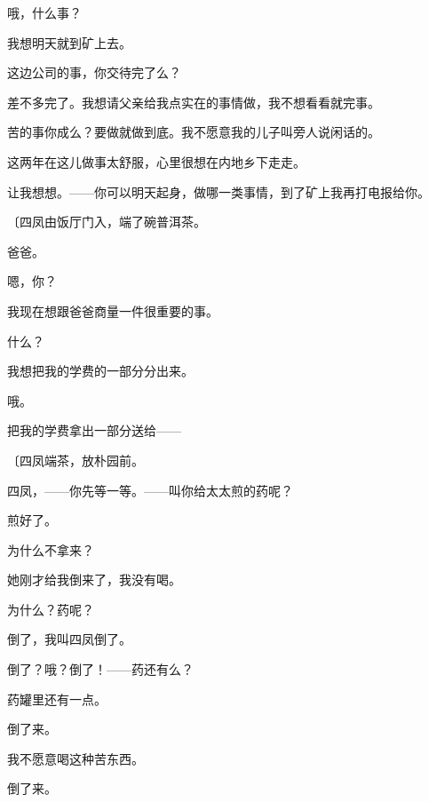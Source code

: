 哦，什么事？

我想明天就到矿上去。

这边公司的事，你交待完了么？

差不多完了。我想请父亲给我点实在的事情做，我不想看看就完事。

苦的事你成么？要做就做到底。我不愿意我的儿子叫旁人说闲话的。

这两年在这儿做事太舒服，心里很想在内地乡下走走。

让我想想。——你可以明天起身，做哪一类事情，到了矿上我再打电报给你。

{\fangsong〔四凤由饭厅门入，端了碗普洱茶。}

爸爸。

嗯，你？

我现在想跟爸爸商量一件很重要的事。

什么？

我想把我的学费的一部分分出来。

哦。

把我的学费拿出一部分送给——

{\fangsong〔四凤端茶，放朴园前。}

四凤，——你先等一等。——叫你给太太煎的药呢？

煎好了。

为什么不拿来？


她刚才给我倒来了，我没有喝。

为什么？药呢？

倒了，我叫四凤倒了。

倒了？哦？倒了！——药还有么？

药罐里还有一点。

倒了来。

我不愿意喝这种苦东西。

倒了来。

